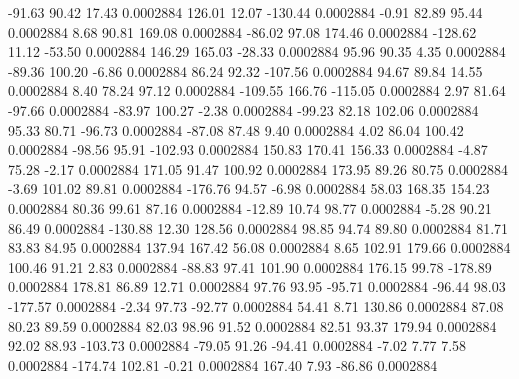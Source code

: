       -91.63       90.42       17.43     0.0002884
      126.01       12.07     -130.44     0.0002884
       -0.91       82.89       95.44     0.0002884
        8.68       90.81      169.08     0.0002884
      -86.02       97.08      174.46     0.0002884
     -128.62       11.12      -53.50     0.0002884
      146.29      165.03      -28.33     0.0002884
       95.96       90.35        4.35     0.0002884
      -89.36      100.20       -6.86     0.0002884
       86.24       92.32     -107.56     0.0002884
       94.67       89.84       14.55     0.0002884
        8.40       78.24       97.12     0.0002884
     -109.55      166.76     -115.05     0.0002884
        2.97       81.64      -97.66     0.0002884
      -83.97      100.27       -2.38     0.0002884
      -99.23       82.18      102.06     0.0002884
       95.33       80.71      -96.73     0.0002884
      -87.08       87.48        9.40     0.0002884
        4.02       86.04      100.42     0.0002884
      -98.56       95.91     -102.93     0.0002884
      150.83      170.41      156.33     0.0002884
       -4.87       75.28       -2.17     0.0002884
      171.05       91.47      100.92     0.0002884
      173.95       89.26       80.75     0.0002884
       -3.69      101.02       89.81     0.0002884
     -176.76       94.57       -6.98     0.0002884
       58.03      168.35      154.23     0.0002884
       80.36       99.61       87.16     0.0002884
      -12.89       10.74       98.77     0.0002884
       -5.28       90.21       86.49     0.0002884
     -130.88       12.30      128.56     0.0002884
       98.85       94.74       89.80     0.0002884
       81.71       83.83       84.95     0.0002884
      137.94      167.42       56.08     0.0002884
        8.65      102.91      179.66     0.0002884
      100.46       91.21        2.83     0.0002884
      -88.83       97.41      101.90     0.0002884
      176.15       99.78     -178.89     0.0002884
      178.81       86.89       12.71     0.0002884
       97.76       93.95      -95.71     0.0002884
      -96.44       98.03     -177.57     0.0002884
       -2.34       97.73      -92.77     0.0002884
       54.41        8.71      130.86     0.0002884
       87.08       80.23       89.59     0.0002884
       82.03       98.96       91.52     0.0002884
       82.51       93.37      179.94     0.0002884
       92.02       88.93     -103.73     0.0002884
      -79.05       91.26      -94.41     0.0002884
       -7.02        7.77        7.58     0.0002884
     -174.74      102.81       -0.21     0.0002884
      167.40        7.93      -86.86     0.0002884
